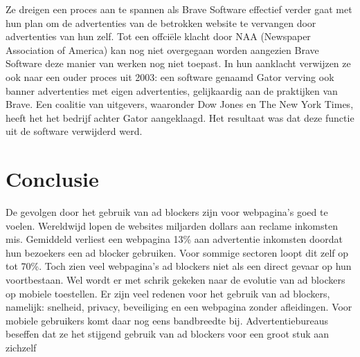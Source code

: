 \documentclass[pdftex,a4paper,12pt,twoside]{report}
\begin{document}
Ze dreigen een proces aan te spannen als Brave Software effectief verder gaat met hun plan om de advertenties van de betrokken website te vervangen door advertenties van hun zelf. Tot een offciële klacht door NAA (Newspaper Association of America) kan nog niet overgegaan worden aangezien Brave Software deze manier van werken nog niet toepast. In hun aanklacht verwijzen ze ook naar een ouder proces uit 2003: een software genaamd Gator verving ook banner advertenties met eigen advertenties, gelijkaardig aan de praktijken van Brave. Een coalitie van uitgevers, waaronder Dow Jones en The New York Times, heeft het het bedrijf achter Gator aangeklaagd. Het resultaat was dat deze functie uit de software verwijderd werd.


\chapter{Conclusie}
\label{ch:conclusie}
De gevolgen door het gebruik van ad blockers zijn voor webpagina's goed te voelen. Wereldwijd lopen de websites miljarden dollars aan reclame inkomsten mis. Gemiddeld verliest een webpagina 13\% aan advertentie inkomsten doordat hun bezoekers een ad blocker gebruiken. Voor sommige sectoren loopt dit zelf op tot 70\%. Toch zien veel webpagina's ad blockers niet als een direct gevaar op hun voortbestaan. Wel wordt er met schrik gekeken naar de evolutie van ad blockers op mobiele toestellen. 
Er zijn veel redenen voor het gebruik van ad blockers, namelijk: snelheid, privacy, beveiliging en een webpagina zonder afleidingen. Voor mobiele gebruikers komt daar nog eens bandbreedte bij. Advertentiebureaus beseffen dat ze het stijgend gebruik van ad blockers voor een groot stuk aan zichzelf 







\listoffigures
\listoftables
\end{document}
